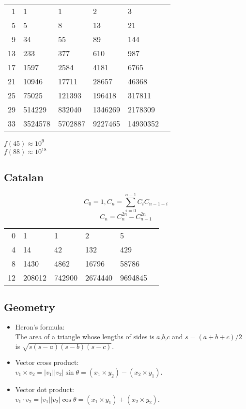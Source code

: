 \documentclass[twocolumn]{article}
\begin{document}
\begin{center}
    \begin{tabular}{r|lllll}
        1 & 1 & 1 & 2 & 3 \\
        5 & 5 & 8 & 13 & 21 \\
        9 & 34 & 55 & 89 & 144 \\
        13 & 233 & 377 & 610 & 987 \\
        17 & 1597 & 2584 & 4181 & 6765 \\
        21 & 10946 & 17711 & 28657 & 46368 \\
        25 & 75025 & 121393 & 196418 & 317811 \\
        29 & 514229 & 832040 & 1346269 & 2178309 \\
        33 & 3524578 & 5702887 & 9227465 & 14930352
    \end{tabular}
\end{center}

$f(45) \approx 10^9$\\
$f(88) \approx 10^{18}$

\subsection{Catalan}

$$C_0=1, C_n=\sum_{i=0}^{n-1} C_i C_{n-1-i}$$
$$C_n=C_n^{2n}-C_{n-1}^{2n}$$

\begin{center}
    \begin{tabular}{r|lllll}
        0 & 1 & 1 & 2 & 5 \\
        4 & 14 & 42 & 132 & 429 \\
        8 & 1430 & 4862 & 16796 & 58786 \\
        12 & 208012 & 742900 & 2674440 & 9694845
    \end{tabular}
\end{center}

\subsection{Geometry}

\begin{itemize}
    \item Heron's formula:\\ The area of a triangle whose lengths of sides is $a$,$b$,$c$ and $s = (a + b + c) / 2$ is $\sqrt{s(s-a)(s-b)(s-c)}$.
    \item Vector cross product:\\ $v_1 \times v_2 = |v_1||v_2| \sin \theta = (x_1 \times y_2) - (x_2 \times y_1)$.
    \item Vector dot product:\\ $v_1 \cdot v_2 = |v_1||v_2| \cos \theta = (x_1 \times y_1) + (x_2 \times y_2)$.
\end{itemize}
\end{document}

